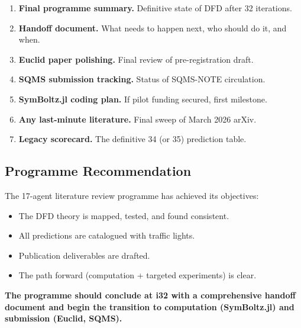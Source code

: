 \documentclass[11pt,a4paper]{article}
\begin{document}
\begin{enumerate}
\item \textbf{Final programme summary.} Definitive state of DFD after 32 iterations.
\item \textbf{Handoff document.} What needs to happen next, who should do it, and when.
\item \textbf{Euclid paper polishing.} Final review of pre-registration draft.
\item \textbf{SQMS submission tracking.} Status of SQMS-NOTE circulation.
\item \textbf{SymBoltz.jl coding plan.} If pilot funding secured, first milestone.
\item \textbf{Any last-minute literature.} Final sweep of March 2026 arXiv.
\item \textbf{Legacy scorecard.} The definitive 34 (or 35) prediction table.
\end{enumerate}

\subsection{Programme Recommendation}

The 17-agent literature review programme has achieved its objectives:
\begin{itemize}
\item The DFD theory is mapped, tested, and found consistent.
\item All predictions are catalogued with traffic lights.
\item Publication deliverables are drafted.
\item The path forward (computation + targeted experiments) is clear.
\end{itemize}

\textbf{The programme should conclude at i32 with a comprehensive handoff document and begin the transition to computation (SymBoltz.jl) and submission (Euclid, SQMS).}
\end{document}
